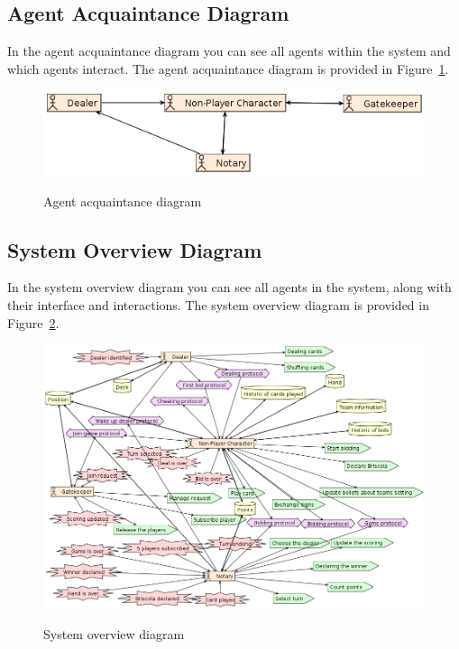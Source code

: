 \documentclass[a4paper]{article}
\begin{document}
\subsection{Agent Acquaintance Diagram}

In the agent acquaintance diagram you can see all agents within the system and which agents interact. The agent acquaintance diagram is provided in Figure~\ref{fig:agentacq}. 

\begin{figure}[htp]
  \includegraphics[keepaspectratio,scale=0.45]{pdt/images/architectural_design/agent_acquaintance.png}
  \label{fig:agentacq}
  \caption{Agent acquaintance diagram}
\end{figure}

\subsection{System Overview Diagram}

In the system overview diagram you can see all agents in the system, along with their interface and interactions. The system overview diagram is provided in Figure~\ref{fig:sysovervw}.

\begin{figure}[htp]
  \includegraphics[keepaspectratio,scale=0.45]{pdt/images/architectural_design/system_overview.png}
  \label{fig:sysovervw}
  \caption{System overview diagram}
\end{figure}
\end{document}
